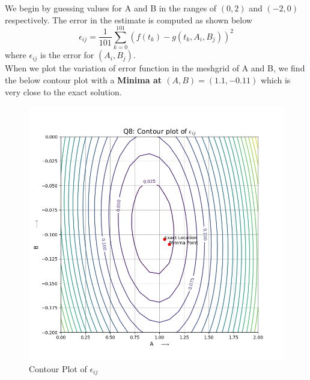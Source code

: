 \documentclass[11pt, a4paper]{article}
\begin{document}
            We begin by guessing values for A and B in the ranges of $(0,2)$ and $(-2,0)$ respectively. The error in the estimate is computed as shown below            
            \begin{equation}
                \epsilon_{ij} = \frac{1}{101}\sum_{k=0}^{101}(f(t_k) - g(t_k, A_i, B_j))^2
            \end{equation}
            where $\epsilon_{ij}$ is the error for $(A_i,B_j)$.\\
            When we plot the variation of error function in the meshgrid of A and B, we find the below contour plot with a \textbf{Minima at $(A,B) = (1.1,-0.11)$} which is very close to the exact solution.
            \begin{figure}[H]
                \centering
                \includegraphics[scale=0.75]{contour_plot.png}  %
                \caption{Contour Plot of $\epsilon_{ij}$}
                \label{fig:contourPlot}
            \end{figure}
\end{document}
